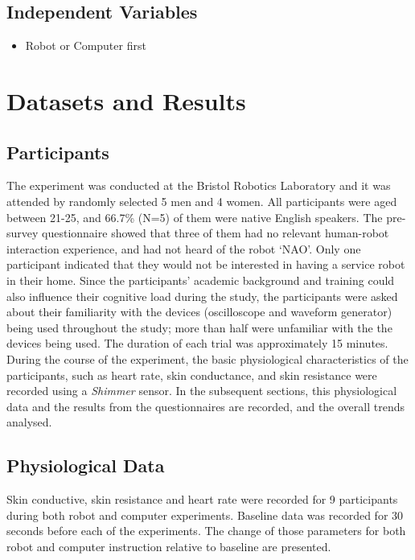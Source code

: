 \documentclass[conference]{IEEEtran}
\begin{document}
\subsection{Independent Variables}
\begin{itemize}
    \item Robot or Computer first
\end{itemize}

\section{Datasets and Results}

\subsection{Participants}

The experiment was conducted at the Bristol Robotics Laboratory and it was attended by randomly selected 5 men and 4 women. All participants were aged between 21-25, and 66.7\% (N=5) of them were native English speakers. The pre-survey questionnaire showed that three of them had no relevant human-robot interaction experience, and had not heard of the robot `NAO'. Only one participant indicated that they would not be interested in having a service robot in their home. Since the participants’ academic background and training could also influence their cognitive load during the study, the participants were asked about their familiarity with the devices (oscilloscope and waveform generator) being used throughout the study; more than half were unfamiliar with the the devices being used. The duration of each trial was approximately 15 minutes. During the course of the experiment, the basic physiological characteristics of the participants, such as heart rate, skin conductance, and skin resistance were recorded using a \textit{Shimmer} sensor. In the subsequent sections, this physiological data and the results from the questionnaires are recorded, and the overall trends analysed. 

\subsection{Physiological Data}
Skin conductive, skin resistance and heart rate were recorded for 9 participants during both robot and computer experiments. Baseline data was recorded for 30 seconds before each of the experiments. The change of those parameters for both robot and computer instruction relative to baseline are presented. \newline
\end{document}
